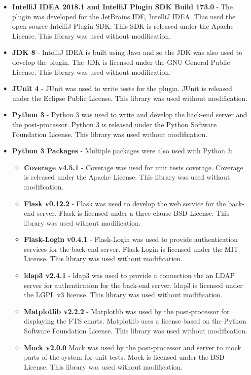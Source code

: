 \begin{itemize}
\item \textbf{IntelliJ IDEA 2018.1 and IntelliJ Plugin SDK Build 173.0} - The plugin was developed for the JetBrains IDE, IntelliJ IDEA. This used the open source IntelliJ Plugin SDK. This SDK is released under the Apache License. This library was used without modification.
\item \textbf{JDK 8} - IntelliJ IDEA is built using Java and so the JDK was also used to develop the plugin. The JDK is licensed under the GNU General Public License. This library was used without modification.
\item \textbf{JUnit 4} - JUnit was used to write tests for the plugin. JUnit is released under the Eclipse Public License. This library was used without modification.
\item \textbf{Python 3} - Python 3 was used to write and develop the back-end server and the post-processor. Python 3 is released under the Python Software Foundation License. This library was used without modification.
\item \textbf{Python 3 Packages} - Multiple packages were also used with Python 3:
  \begin{itemize}
  \item \textbf{Coverage v4.5.1} - Coverage was used for unit tests coverage. Coverage is released under the Apache License. This library was used without modification.
  \item \textbf{Flask v0.12.2} - Flask was used to develop the web service for the back-end server. Flask is licensed under a three clause BSD License. This library was used without modification.
  \item \textbf{Flask-Login v0.4.1} - Flask-Login was used to provide authentication services for the back-end server. Flask-Login is licensed under the MIT License. This library was used without modification.
  \item \textbf{ldap3 v2.4.1} - ldap3 was used to provide a connection the an LDAP server for authentication for the back-end server. ldap3 is licensed under the LGPL v3 license. This library was used without modification.
  \item \textbf{Matplotlib v2.2.2} - Matplotlib was used by the post-processor for displaying the FTS charts. Matplotlib uses a license based on the Python Software Foundation License. This library was used without modification.
  \item \textbf{Mock v2.0.0} Mock was used by the post-processor and server to mock parts of the system for unit tests. Mock is licensed under the BSD License. This library was used without modification.

\end{itemize}
\end{itemize}
